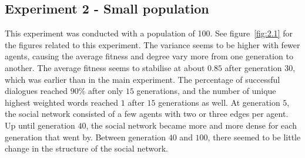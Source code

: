 \clearpage
\subsection{Experiment 2 - Small population}
This experiment was conducted with a population of 100. See figure~\ref{fig:2.1} for the figures related to this experiment. The variance seems to be higher with fewer agents, causing the average fitness and degree vary more from one generation to another. The average fitness seems to stabilise at about $0.85$ after generation $30$, which was earlier than in the main experiment. The percentage of successful dialogues reached $90\%$ after only $15$ generations, and the number of unique highest weighted words reached $1$ after $15$ generations as well. At generation $5$, the social network consisted of a few agents with two or three edges per agent. Up until generation $40$, the social network became more and more dense for each generation that went by. Between generation $40$ and $100$, there seemed to be little change in the structure of the social network.   

